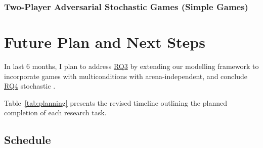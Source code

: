 \documentclass{article}
\begin{document}

\subsubsection{Two-Player Adversarial Stochastic Games (Simple Games)}


\section{Future Plan and Next Steps}

In last 6 months, I plan to address \hyperref[sec:rq]{RQ3} by extending our modelling framework to incorporate games with multiconditions with arena-independent, and conclude \hyperref[sec:rq]{RQ4} stochastic \wregulargames.


Table~\ref{tab:planning} presents the revised timeline outlining the planned completion of each research task.

\subsection{Schedule}
\end{document}
